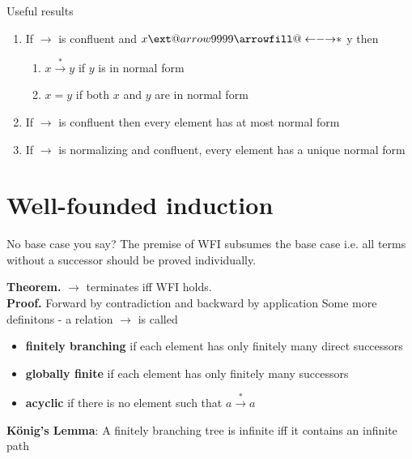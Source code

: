 \documentclass[titlepage, 12pt]{article}
\makeatletter
\newcommand\xleftrightarrow[2][]{%
\ext@arrow 9999{\longleftrightarrowfill@}{#1}{#2}}
\newcommand\longleftrightarrowfill@{%
\arrowfill@\leftarrow\relbar\rightarrow}
\makeatother
\begin{document}
Useful results
\begin{enumerate}
    \item If $\rightarrow$ is confluent and $x\xleftrightarrow{*}$ y then
        \begin{enumerate}
            \item $x\xrightarrow{*} y$ if $y$ is in normal form
            \item $x = y$ if both $x$ and $y$ are in normal form
        \end{enumerate}
    \item If $\rightarrow$ is confluent then every element has at most normal form
    \item If $\rightarrow$ is normalizing and confluent, every element has a
        unique normal form
\end{enumerate}

\section{Well-founded induction}
No base case you say? The premise of WFI subsumes the base case i.e. all terms
without a successor should be proved individually.

\textbf{Theorem.} $\rightarrow$ terminates iff WFI holds.\\
\textbf{Proof.} Forward by contradiction and backward by application
Some more definitons - a relation $\rightarrow$ is called
\begin{itemize}
    \item\textbf{finitely branching} if each element has only finitely many
        direct successors
    \item\textbf{globally finite} if each element has only finitely many
        successors
    \item\textbf{acyclic} if there is no element such that $a\xrightarrow{*}a$
\end{itemize}
\textbf{K\"onig's Lemma}: A finitely branching tree is infinite iff it contains
an infinite path
\end{document}
